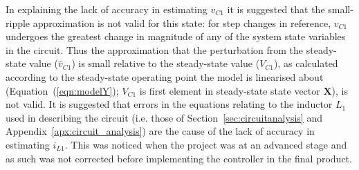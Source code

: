 In explaining the lack of accuracy in estimating $v_{C1}$ it is suggested that the small-ripple approximation is not valid for this state: for step changes in reference, $v_{C1}$ undergoes the greatest change in magnitude of any of the system state variables in the circuit. Thus the approximation that the perturbation from the steady-state value ($\hat{v}_{C1}$) is small relative to the steady-state value ($V_{C1}$), as calculated according to the steady-state operating point the model is linearised about (Equation~(\ref{eqn:modelY}); $V_{C1}$ is first element in steady-state state vector $\boldsymbol{X}$), is not valid.
\newpar
It is suggested that errors in the equations relating to the inductor $L_1$ used in describing the circuit (i.e. those of Section~\ref{sec:circuitanalysis} and Appendix~\ref{apx:circuit_analysis}) are the cause of the lack of accuracy in estimating $i_{L1}$. This was noticed when the project was at an advanced stage and as such was not corrected before implementing the controller in the final product.

